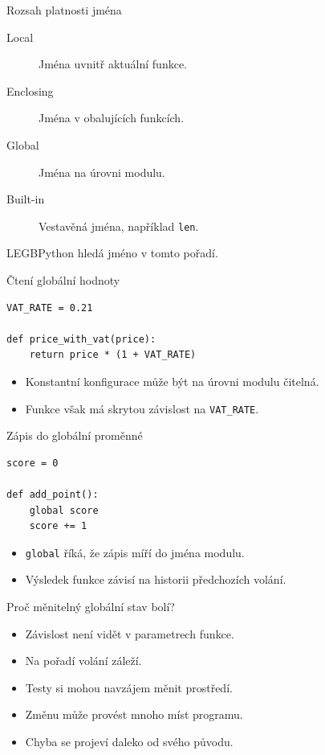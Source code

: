 \documentclass[aspectratio=169]{beamer}
\begin{document}
\begin{frame}{Rozsah platnosti jména}
\begin{description}
\item[Local] Jména uvnitř aktuální funkce.
\item[Enclosing] Jména v obalujících funkcích.
\item[Global] Jména na úrovni modulu.
\item[Built-in] Vestavěná jména, například \texttt{len}.
\end{description}
\begin{block}{LEGB}Python hledá jméno v tomto pořadí.\end{block}
\end{frame}

\begin{frame}[fragile]{Čtení globální hodnoty}
\begin{lstlisting}[style=python]
VAT_RATE = 0.21

def price_with_vat(price):
    return price * (1 + VAT_RATE)
\end{lstlisting}
\begin{itemize}
\item Konstantní konfigurace může být na úrovni modulu čitelná.
\item Funkce však má skrytou závislost na \texttt{VAT\_RATE}.
\end{itemize}
\end{frame}

\begin{frame}[fragile]{Zápis do globální proměnné}
\begin{lstlisting}[style=python]
score = 0

def add_point():
    global score
    score += 1
\end{lstlisting}
\begin{itemize}
\item \texttt{global} říká, že zápis míří do jména modulu.
\item Výsledek funkce závisí na historii předchozích volání.
\end{itemize}
\end{frame}

\begin{frame}{Proč měnitelný globální stav bolí?}
\begin{itemize}
\item Závislost není vidět v parametrech funkce.
\item Na pořadí volání záleží.
\item Testy si mohou navzájem měnit prostředí.
\item Změnu může provést mnoho míst programu.
\item Chyba se projeví daleko od svého původu.
\end{itemize}
\end{frame}
\end{document}
